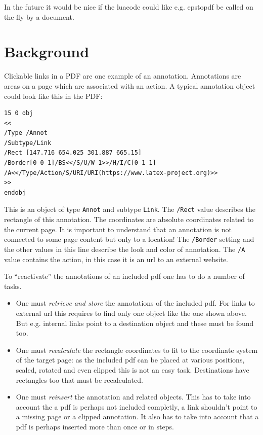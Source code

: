 \documentclass[DIV=12,parskip=half-,bibliography=totoc]{scrartcl}
\begin{document}
In the future it would be nice if the luacode could like e.g. epstopdf be called on the fly by a document.

\section{Background}

Clickable links in a PDF are one example of an annotation. Annotations are areas on a page which are associated with an action. A typical annotation object could look like this in the PDF:

\begin{lstlisting}
15 0 obj
<<
/Type /Annot
/Subtype/Link
/Rect [147.716 654.025 301.887 665.15]
/Border[0 0 1]/BS<</S/U/W 1>>/H/I/C[0 1 1]
/A<</Type/Action/S/URI/URI(https://www.latex-project.org)>>
>>
endobj
\end{lstlisting}
This is an object of type \texttt{Annot} and subtype \texttt{Link}.
The \texttt{/Rect} value describes the rectangle of this annotation. The coordinates are absolute coordinates related to the current page. It is important to understand that an annotation is not connected to some page content but only to a location!
The \texttt{/Border} setting and the other values in this line describe the look and color of annotation. The \texttt{/A} value contains the action, in this case it is an url to an external website.


To \enquote{reactivate} the annotations of an included pdf one has to do a number of tasks.
\begin{itemize}
\item One must \emph{retrieve and store} the annotations of the included pdf. For links to external url this requires to find only one object like the one shown above. But e.g. internal links point to a destination object and these must be found too.
\item One must \emph{recalculate} the rectangle coordinates to fit to the coordinate system of the target page: as the included pdf can be placed at various positions, scaled, rotated and even clipped this is not an easy task. Destinations have rectangles too that must be recalculated.
\item  One must  \emph{reinsert} the annotation and related objects. This has to take into account the a pdf is perhaps not included completly, a link shouldn't point to a missing page or a clipped annotation. It also has to take into account that a pdf is perhaps inserted more than once or in steps.
\end{itemize}
\end{document}
